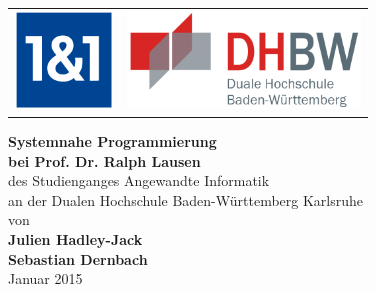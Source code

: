 
\begin{titlepage}
	\begin{longtable}{p{} p{}}
	  {\includegraphics[height=2.6cm]{images/1und1-logo}} & 
	  {\includegraphics[height=2.6cm]{images/dhbw.png}}
	\end{longtable}
	\enlargethispage{20mm}
	\begin{center}
	  \vspace*{12mm}	{\LARGE\bf Systemnahe Programmierung }\\
	  \vspace*{12mm}	{\large\bf bei Prof. Dr. Ralph Lausen}\\
	  \vspace*{12mm}	des Studienganges Angewandte Informatik\\
	  \vspace*{3mm} 	an der Dualen Hochschule Baden-Württemberg Karlsruhe\\
	  \vspace*{12mm}	von\\
	  \vspace*{3mm} 	{\large\bf Julien Hadley-Jack\\Sebastian Dernbach}\\
	  \vspace*{12mm}	Januar 2015\\
	\end{center}
	\vfill
\end{titlepage}